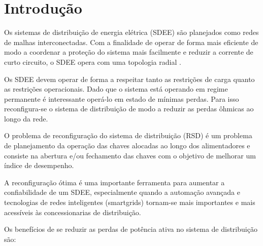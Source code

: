 \section{Introdução}

Os sistemas de distribuição de energia elétrica (SDEE) são planejados como redes de malhas interconectadas. Com a finalidade de operar de forma mais eficiente de modo a coordenar a proteção do sistema mais facilmente e reduzir a corrente de curto circuito, o SDEE opera com uma topologia radial \cite{Romais2014ReconfiguracaoMista}.

Os SDEE devem operar de forma a respeitar tanto as restrições de carga quanto as restrições operacionais. Dado que o sistema está operando em regime permanente é interessante operá-lo em estado de mínimas perdas. Para isso reconfigura-se o sistema de distribuição de modo a reduzir as perdas ôhmicas ao longo da rede.

O problema de reconfiguração do sistema de distribuição (RSD) é um problema de planejamento da operação das chaves alocadas ao longo dos alimentadores e consiste na abertura e/ou fechamento das chaves com o objetivo de melhorar um índice de desempenho.

A reconfiguração ótima é uma importante ferramenta para aumentar a confiabilidade de um SDEE, especialmente quando a automação avançada e tecnologias de redes inteligentes (smartgrids) tornam-se mais importantes e mais acessíveis às concessionarias de distribuição.

Os benefícios de se reduzir as perdas de potência ativa no sistema de distribuição são:%

